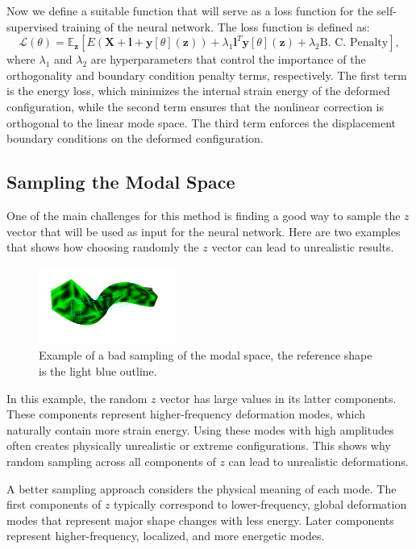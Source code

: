 Now we define a suitable function that will serve as a loss function for the self-supervised training of the neural network. The loss function is defined as:
\begin{equation}
    \mathcal{L}(\theta) = \mathbb{E}_{\bm{z}} \left[ E(\bm{X} + \bm{l} + \bm{y}[\theta](\bm{z})) + \lambda_1 \bm{l}^T \bm{y}[\theta](\bm{z}) + \lambda_2 \text{B. C. Penalty} \right],
\end{equation}
where \( \lambda_1 \) and \( \lambda_2 \) are hyperparameters that control the importance of the orthogonality and boundary condition penalty terms, respectively. The first term is the energy loss, which minimizes the internal strain energy of the deformed configuration, while the second term ensures that the nonlinear correction is orthogonal to the linear mode space. The third term enforces the displacement boundary conditions on the deformed configuration.

\subsection{Sampling the Modal Space}
One of the main challenges for this method is finding a good way to sample the \(z\) vector that will be used as input for the neural network. Here are two examples that shows how choosing randomly the \(z\) vector can lead to unrealistic results. 
\begin{figure}[H]
    \centering
    \includegraphics[width=0.4\textwidth]{Images/z_random.png}
    \caption{Example of a bad sampling of the modal space, the reference shape is the light blue outline.}
    \label{fig:bad_sampling}
\end{figure}
In this example, the random \(z\) vector has large values in its latter components. These components represent higher-frequency deformation modes, which naturally contain more strain energy. Using these modes with high amplitudes often creates physically unrealistic or extreme configurations. This shows why random sampling across all components of \(z\) can lead to unrealistic deformations.

A better sampling approach considers the physical meaning of each mode. The first components of \(z\) typically correspond to lower-frequency, global deformation modes that represent major shape changes with less energy. Later components represent higher-frequency, localized, and more energetic modes. 

